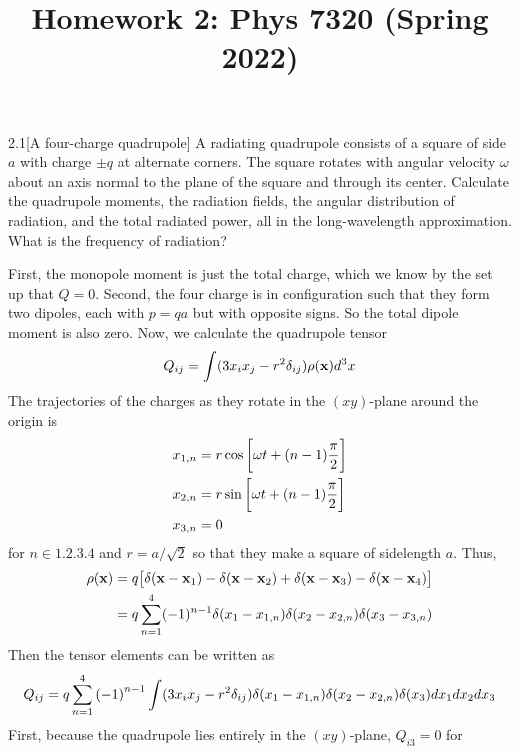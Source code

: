 \documentclass[12pt]{article}
\title{Homework 2: Phys 7320 (Spring 2022)}
\begin{document}
\maketitle
\begin{problem}{2.1}[A four-charge quadrupole]
A radiating quadrupole consists of a square of side $a$ with charge $\pm q$ at
alternate corners. The square rotates with angular velocity $\omega$ about an
axis normal to the plane of the square and through its center. Calculate the
quadrupole moments, the radiation fields, the angular distribution of radiation,
and the total radiated power, all in the long-wavelength approximation. What is
the frequency of radiation?
\begin{solution}
First, the monopole moment is just the total charge, which we know by the set up
that $Q=0$. Second, the four charge is in configuration such that they form two
dipoles, each with $p=qa$ but with opposite signs. So the total dipole moment is
also zero. Now, we calculate the quadrupole tensor
\begin{equation}
    Q_{ij}=\int(3x_ix_j-r^2\delta_{ij})\rho(\vb{x})d^3x 
\end{equation}
The trajectories of the charges as they rotate in the $(xy)$-plane around the
origin is
\begin{subequations}
    \begin{align}
        x_{1,n}&=r\cos\qty[\omega t+(n-1)\frac\pi2]\\
        x_{2,n}&=r\sin\qty[\omega t+(n-1)\frac\pi2]\\
        x_{3,n}&=0
    \end{align} 
\end{subequations}
for $n\in\qty{1,2,3,4}$ and $r=a/\sqrt2$ so that they make a square of
sidelength $a$. Thus,
\begin{align}
    \rho(\vb{x})&=q\qty[\delta(\vb{x}-\vb{x}_1)
    -\delta(\vb{x}-\vb{x}_2)
    +\delta(\vb{x}-\vb{x}_3)
    -\delta(\vb{x}-\vb{x}_4)
    ]\notag\\
            &=q\sum_{n=1}^4(-1)^{n-1}\delta(x_1-x_{1,n})
\delta(x_2-x_{2,n})\delta(x_3-x_{3,n})
\end{align}
Then the tensor elements can be written as
\begin{equation}\label{p1:Q}
    Q_{ij}=q\sum_{n=1}^4\qty(-1)^{n-1}\int (3x_ix_j-r^2\delta_{ij})
    \delta(x_1-x_{1,n})\delta(x_2-x_{2,n})\delta(x_3)dx_1dx_2dx_3
\end{equation}
First, because the quadrupole lies entirely in the $(xy)$-plane, $Q_{i3}=0$ for

\end{solution}
\end{problem}
\end{document}

